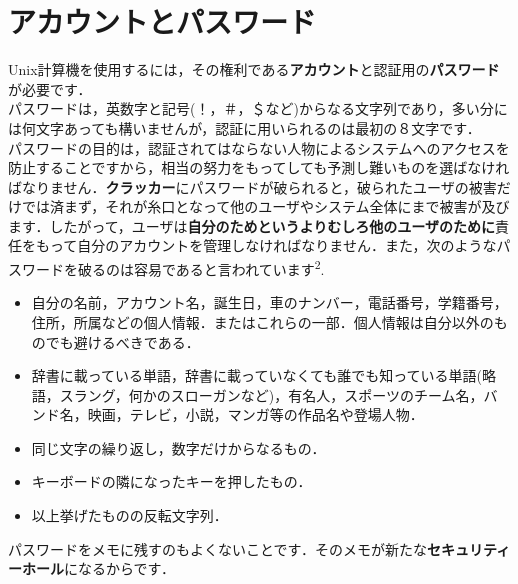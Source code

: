 \documentclass[main]{subfiles}
\begin{document}
\chapter{アカウントとパスワード}

\fontsize{10.2}{10} \selectfont
Unix計算機を使用するには，その権利である\textbf{アカウント}と認証用の\textbf{パスワード}が必要です．\\
\indent
パスワードは，英数字と記号(！，＃，＄など)からなる文字列であり，多い分には何文字あっても構いませんが，認証に用いられるのは最初の８文字です．\\
\indent
パスワードの目的は，認証されてはならない人物によるシステムへのアクセスを防止することですから，相当の努力をもってしても予測し難いものを選ばなければなりません．\textbf{クラッカー}にパスワードが破られると，破られたユーザの被害だけでは済まず，それが糸口となって他のユーザやシステム全体にまで被害が及びます．したがって，ユーザは\textbf{自分のためというよりむしろ他のユーザのために}責任をもって自分のアカウントを管理しなければなりません．また，次のようなパスワードを破るのは容易であると言われています\textsuperscript{2}.\\

\begin{itemize}
    \setlength{\itemsep}{0.7zw}         %
    \item 自分の名前，アカウント名，誕生日，車のナンバー，電話番号，学籍番号，住所，所属などの個人情報．またはこれらの一部．個人情報は自分以外のものでも避けるべきである．
    \item 辞書に載っている単語，辞書に載っていなくても誰でも知っている単語(略語，スラング，何かのスローガンなど)，有名人，スポーツのチーム名，バンド名，映画，テレビ，小説，マンガ等の作品名や登場人物．
    \item 同じ文字の繰り返し，数字だけからなるもの．
    \item キーボードの隣になったキーを押したもの．
    \item 以上挙げたものの反転文字列．
\end{itemize}

パスワードをメモに残すのもよくないことです．そのメモが新たな\textbf{セキュリティーホール}になるからです．\\
\end{document}
